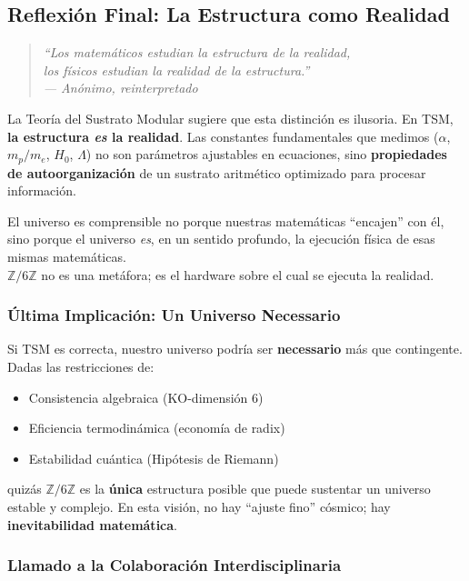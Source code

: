\documentclass[11pt, a4paper]{article}
\theoremstyle{plain}
\theoremstyle{definition}
\newcommand{\Zmod}{\mathbb{Z}/6\mathbb{Z}}
\begin{document}
\subsection{Reflexión Final: La Estructura como Realidad}

\begin{quotation}
\centering
\itshape
``Los matemáticos estudian la estructura de la realidad, \\
los físicos estudian la realidad de la estructura.'' \\
--- Anónimo, reinterpretado
\end{quotation}

La Teoría del Sustrato Modular sugiere que esta distinción es ilusoria. En TSM, \textbf{la estructura \textit{es} la realidad}. Las constantes fundamentales que medimos ($\alpha$, $m_p/m_e$, $H_0$, $\Lambda$) no son parámetros ajustables en ecuaciones, sino \textbf{propiedades de autoorganización} de un sustrato aritmético optimizado para procesar información.

El universo es comprensible no porque nuestras matemáticas ``encajen'' con él, sino porque el universo \textit{es}, en un sentido profundo, la ejecución física de esas mismas matemáticas.\\
$\Zmod$ no es una metáfora; es el hardware sobre el cual se ejecuta la realidad.

\subsubsection{Última Implicación: Un Universo Necessario}

Si TSM es correcta, nuestro universo podría ser \textbf{necessario} más que contingente. Dadas las restricciones de:
\begin{itemize}
    \item Consistencia algebraica (KO-dimensión 6)
    \item Eficiencia termodinámica (economía de radix)
    \item Estabilidad cuántica (Hipótesis de Riemann)
\end{itemize}

quizás $\Zmod$ es la \textbf{única} estructura posible que puede sustentar un universo estable y complejo. En esta visión, no hay ``ajuste fino'' cósmico; hay \textbf{inevitabilidad matemática}.

\subsubsection{Llamado a la Colaboración Interdisciplinaria}
\end{document}
